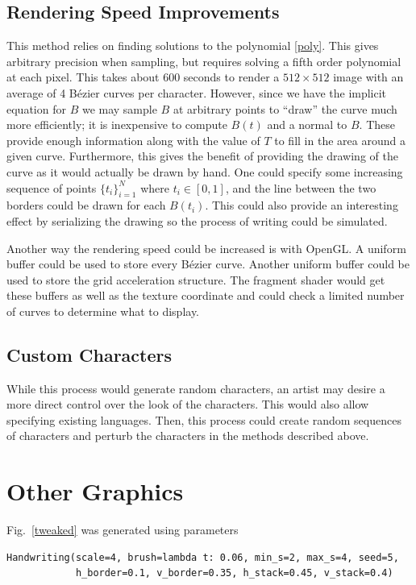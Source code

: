 \documentclass[12pt]{article}
\begin{document}
\subsection{Rendering Speed Improvements}
This method relies on finding solutions to the polynomial \eqref{poly}. This gives arbitrary precision when sampling, but requires solving a fifth order polynomial at each pixel. This takes about 600 seconds to render a $512 \times 512$ image with an average of 4 B\'ezier curves per character. However, since we have the implicit equation for $B$ we may sample $B$ at arbitrary points to ``draw'' the curve much more efficiently; it is inexpensive to compute $B(t)$ and a normal to $B$. These provide enough information along with the value of $T$ to fill in the area around a given curve. Furthermore, this gives the benefit of providing the drawing of the curve as it would actually be drawn by hand. One could specify some increasing sequence of points $\{t_i\}_{i=1}^N$ where $t_i \in [0,1]$, and the line between the two borders could be drawn for each $B(t_i)$. This could also provide an interesting effect by serializing the drawing so the process of writing could be simulated.

Another way the rendering speed could be increased is with OpenGL. A uniform buffer could be used to store every B\'ezier curve. Another uniform buffer could be used to store the grid acceleration structure. The fragment shader would get these buffers as well as the texture coordinate and could check a limited number of curves to determine what to display.

\subsection{Custom Characters}
While this process would generate random characters, an artist may desire a more direct control over the look of the characters. This would also allow specifying existing languages. Then, this process could create random sequences of characters and perturb the characters in the methods described above.

\section{Other Graphics}
Fig.~\ref{tweaked} was generated using parameters
\begin{Verbatim}
Handwriting(scale=4, brush=lambda t: 0.06, min_s=2, max_s=4, seed=5,
            h_border=0.1, v_border=0.35, h_stack=0.45, v_stack=0.4)
\end{Verbatim}
\end{document}
